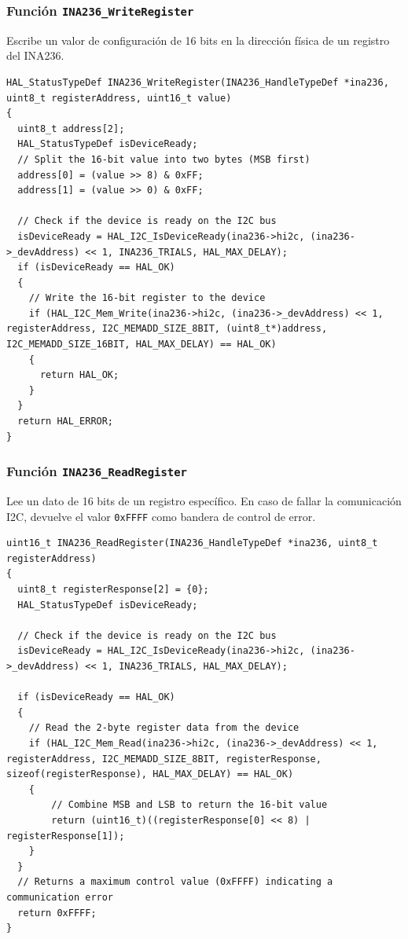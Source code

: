 \documentclass[
10pt, %
a4paper, %
oneside, %
headinclude,footinclude, %
BCOR5mm, %
]{scrartcl}
\begin{document}
\subsubsection{Función \texttt{INA236\_WriteRegister}}
Escribe un valor de configuración de 16 bits en la dirección física de un registro del INA236.
\begin{lstlisting}[style=CMakeStyle]
HAL_StatusTypeDef INA236_WriteRegister(INA236_HandleTypeDef *ina236, uint8_t registerAddress, uint16_t value)
{
  uint8_t address[2];
  HAL_StatusTypeDef isDeviceReady;
  // Split the 16-bit value into two bytes (MSB first)
  address[0] = (value >> 8) & 0xFF;
  address[1] = (value >> 0) & 0xFF;
  
  // Check if the device is ready on the I2C bus
  isDeviceReady = HAL_I2C_IsDeviceReady(ina236->hi2c, (ina236->_devAddress) << 1, INA236_TRIALS, HAL_MAX_DELAY);
  if (isDeviceReady == HAL_OK)
  {
    // Write the 16-bit register to the device
    if (HAL_I2C_Mem_Write(ina236->hi2c, (ina236->_devAddress) << 1, registerAddress, I2C_MEMADD_SIZE_8BIT, (uint8_t*)address, I2C_MEMADD_SIZE_16BIT, HAL_MAX_DELAY) == HAL_OK)
    {
      return HAL_OK;
    }
  }
  return HAL_ERROR;
}
\end{lstlisting}

\subsubsection{Función \texttt{INA236\_ReadRegister}}
Lee un dato de 16 bits de un registro específico. En caso de fallar la comunicación I2C, devuelve el valor \texttt{0xFFFF} como bandera de control de error.
\begin{lstlisting}[style=CMakeStyle]
uint16_t INA236_ReadRegister(INA236_HandleTypeDef *ina236, uint8_t registerAddress)
{
  uint8_t registerResponse[2] = {0}; 
  HAL_StatusTypeDef isDeviceReady;   

  // Check if the device is ready on the I2C bus
  isDeviceReady = HAL_I2C_IsDeviceReady(ina236->hi2c, (ina236->_devAddress) << 1, INA236_TRIALS, HAL_MAX_DELAY);

  if (isDeviceReady == HAL_OK)
  {
    // Read the 2-byte register data from the device
    if (HAL_I2C_Mem_Read(ina236->hi2c, (ina236->_devAddress) << 1, registerAddress, I2C_MEMADD_SIZE_8BIT, registerResponse, sizeof(registerResponse), HAL_MAX_DELAY) == HAL_OK)
    {
        // Combine MSB and LSB to return the 16-bit value
        return (uint16_t)((registerResponse[0] << 8) | registerResponse[1]);
    }    
  }
  // Returns a maximum control value (0xFFFF) indicating a communication error
  return 0xFFFF;
}
\end{lstlisting}
\end{document}
